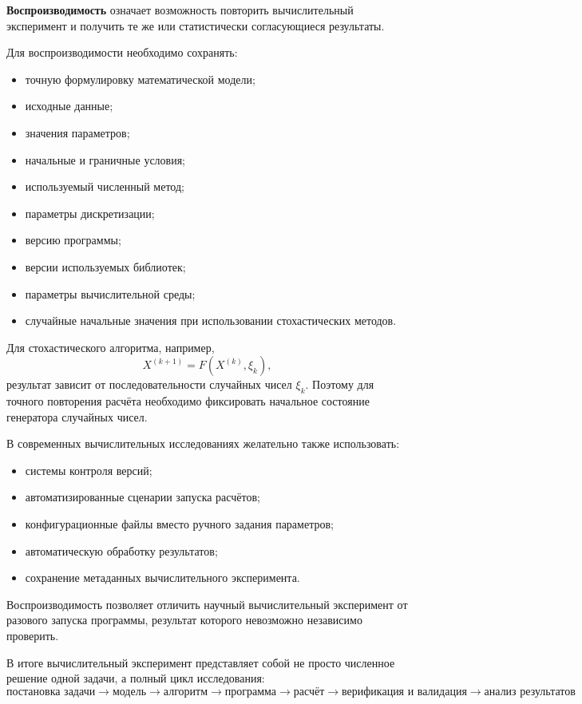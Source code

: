 \textbf{Воспроизводимость} означает возможность повторить вычислительный эксперимент и получить те же или статистически согласующиеся результаты.

Для воспроизводимости необходимо сохранять:

\begin{itemize}
	\item точную формулировку математической модели;
	\item исходные данные;
	\item значения параметров;
	\item начальные и граничные условия;
	\item используемый численный метод;
	\item параметры дискретизации;
	\item версию программы;
	\item версии используемых библиотек;
	\item параметры вычислительной среды;
	\item случайные начальные значения при использовании стохастических методов.
\end{itemize}

Для стохастического алгоритма, например,
\[
X^{(k+1)}=F(X^{(k)},\xi_k),
\]
результат зависит от последовательности случайных чисел $\xi_k$. Поэтому для точного повторения расчёта необходимо фиксировать начальное состояние генератора случайных чисел.

В современных вычислительных исследованиях желательно также использовать:
\begin{itemize}
	\item системы контроля версий;
	\item автоматизированные сценарии запуска расчётов;
	\item конфигурационные файлы вместо ручного задания параметров;
	\item автоматическую обработку результатов;
	\item сохранение метаданных вычислительного эксперимента.
\end{itemize}

Воспроизводимость позволяет отличить научный вычислительный эксперимент от разового запуска программы, результат которого невозможно независимо проверить.

В итоге вычислительный эксперимент представляет собой не просто численное решение одной задачи, а полный цикл исследования:
\[
\boxed{
	\text{постановка задачи}
	\rightarrow
	\text{модель}
	\rightarrow
	\text{алгоритм}
	\rightarrow
	\text{программа}
	\rightarrow
	\text{расчёт}
	\rightarrow
	\text{верификация и валидация}
	\rightarrow
	\text{анализ результатов}
}
\]

\newpage